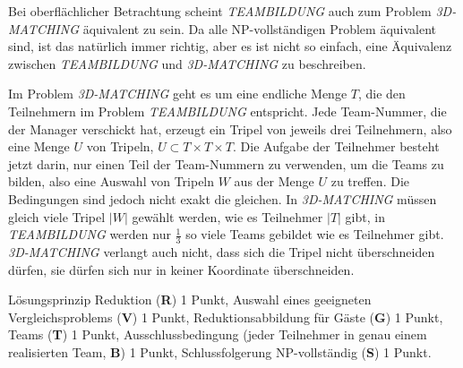 \begin{diskussion}
Bei oberflächlicher Betrachtung scheint \textsl{TEAMBILDUNG} auch
zum Problem \textsl{3D-MATCHING} äquivalent zu sein. Da alle NP-vollständigen
Problem äquivalent sind, ist das natürlich immer richtig, aber
es ist nicht so einfach, eine Äquivalenz zwischen 
\textsl{TEAMBILDUNG} und 
\textsl{3D-MATCHING} zu beschreiben.

Im Problem \textsl{3D-MATCHING} geht es um eine endliche Menge $T$,
die den Teilnehmern im Problem \textsl{TEAMBILDUNG} entspricht.
Jede Team-Nummer, die der Manager verschickt hat, erzeugt ein Tripel
von jeweils drei Teilnehmern, also eine Menge $U$ von Tripeln,
$U\subset T\times T\times T$. Die Aufgabe der Teilnehmer besteht
jetzt darin, nur einen Teil der Team-Nummern zu verwenden, um
die Teams zu bilden, also eine Auswahl von Tripeln $W$ aus der Menge $U$
zu treffen. Die Bedingungen sind jedoch nicht exakt die gleichen.
In \textsl{3D-MATCHING} müssen gleich viele Tripel $|W|$
gewählt werden, wie es Teilnehmer $|T|$ gibt, in 
\textsl{TEAMBILDUNG} werden nur $\frac13$ so viele Teams gebildet
wie es Teilnehmer gibt. \textsl{3D-MATCHING} verlangt auch nicht,
dass sich die Tripel nicht überschneiden dürfen, sie dürfen sich
nur in keiner Koordinate überschneiden.
\end{diskussion}

\begin{bewertung}
Lösungsprinzip Reduktion ({\bf R}) 1 Punkt,
Auswahl eines geeigneten Vergleichsproblems ({\bf V}) 1 Punkt,
Reduktionsabbildung für Gäste ({\bf G}) 1 Punkt,
Teams ({\bf T}) 1 Punkt,
Ausschlussbedingung (jeder Teilnehmer in genau einem realisierten Team,
{\bf B}) 1 Punkt,
Schlussfolgerung NP-vollständig ({\bf S}) 1 Punkt.
\end{bewertung}
